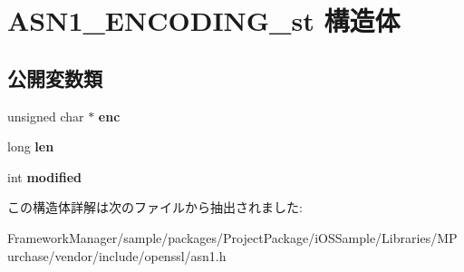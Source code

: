 \hypertarget{struct_a_s_n1___e_n_c_o_d_i_n_g__st}{}\section{A\+S\+N1\+\_\+\+E\+N\+C\+O\+D\+I\+N\+G\+\_\+st 構造体}
\label{struct_a_s_n1___e_n_c_o_d_i_n_g__st}
\subsection*{公開変数類}
\begin{DoxyCompactItemize}
\item 
\hypertarget{struct_a_s_n1___e_n_c_o_d_i_n_g__st_afa11cb714645d40f5602574e57ac8cb9}{}unsigned char $\ast$ {\bfseries enc}\label{struct_a_s_n1___e_n_c_o_d_i_n_g__st_afa11cb714645d40f5602574e57ac8cb9}

\item 
\hypertarget{struct_a_s_n1___e_n_c_o_d_i_n_g__st_a1d4db56d95977ef9daad570912a187cc}{}long {\bfseries len}\label{struct_a_s_n1___e_n_c_o_d_i_n_g__st_a1d4db56d95977ef9daad570912a187cc}

\item 
\hypertarget{struct_a_s_n1___e_n_c_o_d_i_n_g__st_a81a85e0aa68d4a31fe277f88d7f1fdd5}{}int {\bfseries modified}\label{struct_a_s_n1___e_n_c_o_d_i_n_g__st_a81a85e0aa68d4a31fe277f88d7f1fdd5}

\end{DoxyCompactItemize}


この構造体詳解は次のファイルから抽出されました\+:\begin{DoxyCompactItemize}
\item 
Framework\+Manager/sample/packages/\+Project\+Package/i\+O\+S\+Sample/\+Libraries/\+M\+Purchase/vendor/include/openssl/asn1.\+h\end{DoxyCompactItemize}
